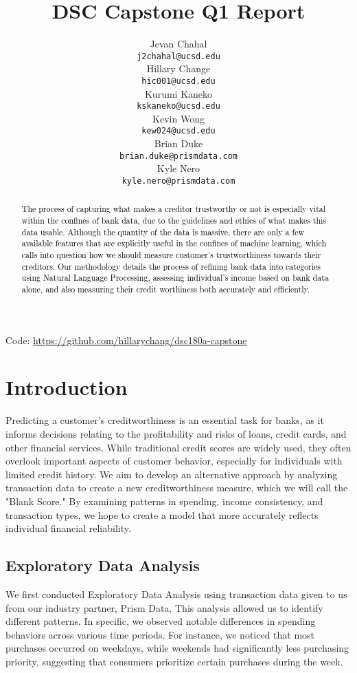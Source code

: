 \documentclass[12pt,letterpaper]{article}
\title{DSC Capstone Q1 Report}
\author{Jevan Chahal\\
  {\tt j2chahal@ucsd.edu} \\\And
  Hillary Change \\
  {\tt hic001@ucsd.edu} \\\And
  Kurumi Kaneko \\
  {\tt kskaneko@ucsd.edu} \\\And
  Kevin Wong \\
  {\tt kew024@ucsd.edu} \\\And
  Brian Duke \\
  {\tt brian.duke@prismdata.com} \\\And
  Kyle Nero \\
  {\tt kyle.nero@prismdata.com} \\}
\begin{document}
\maketitle


\begin{abstract}
    \textcolor{Black}{
    The process of capturing what makes a creditor trustworthy or not is especially vital within the confines of bank data, due to the guidelines and ethics of what makes this data usable. Although the quantity of the data is massive, there are only a few available features that are explicitly useful in the confines of machine learning, which calls into question how we should measure customer's trustworthiness towards their creditors. Our methodology details the process of refining bank data into categories using Natural Language Processing, assessing individual's income based on bank data alone, and also measuring their credit worthiness both accurately and efficiently. 
    }
\end{abstract}

\begin{center}
Code: \url{https://github.com/hillarychang/dsc180a-capstone}
\end{center}

\maketoc
\clearpage


\section{Introduction}
Predicting a customer’s creditworthiness is an essential task for banks, as it informs decisions relating to the profitability and risks of loans, credit cards, and other financial services. While traditional credit scores are widely used, they often overlook important aspects of customer behavior, especially for individuals with limited credit history. We aim to develop an alternative approach by analyzing transaction data to create a new creditworthiness measure, which we will call the "Blank Score." By examining patterns in spending, income consistency, and transaction types, we hope to create a model that more accurately reflects individual financial reliability.

\subsection{Exploratory Data Analysis}
We first conducted Exploratory Data Analysis using transaction data given to us from our industry partner, Prism Data. This analysis allowed us to identify different patterns. In specific, we observed notable differences in spending behaviors across various time periods. For instance, we noticed that most purchases occurred on weekdays, while weekends had significantly less purchasing priority, suggesting that consumers prioritize certain purchases during the week. 
\end{document}
